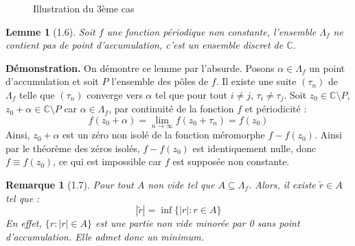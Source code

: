 \documentclass{article}
\newtheorem{lemma}{Lemme}
\newtheorem{remark}{Remarque}
\begin{document}
\begin{figure}[h]
    \centering
    \caption{Illustration du 3ème cas}
    \end{figure}


\begin{lemma}[1.6]
Soit \( f \) une fonction périodique non constante, l'ensemble \( \Lambda_f \) ne contient pas de point d'accumulation, c'est un ensemble discret de \( \mathbb{C} \).
\end{lemma}

\textbf{Démonstration.}
On démontre ce lemme par l'absurde. Posons \( \alpha \in \Lambda_f \) un point d'accumulation et soit \( P \) l'ensemble des pôles de \( f \). Il existe une suite \( (\tau_n) \) de \( \Lambda_f \) telle que \( (\tau_n) \) converge vers \( \alpha \) tel que pour tout \( i \neq j \), \( \tau_i \neq \tau_j \). Soit \( z_0 \in \mathbb{C}\setminus P \), \( z_0 + \alpha \in \mathbb{C}\setminus P \) car \( \alpha \in \Lambda_f \), par continuité de la fonction \( f \) et périodicité :
\[
f(z_0 + \alpha) = \lim_{n \to \infty} f(z_0 + \tau_n) = f(z_0)
\]
Ainsi, \( z_0 + \alpha \) est un zéro non isolé de la fonction méromorphe \( f - f(z_0) \). Ainsi par le théorème des zéros isolés, \( f - f(z_0) \) est identiquement nulle, donc \( f \equiv f(z_0) \), ce qui est impossible car \( f \) est supposée non constante.

\begin{remark}[1.7]
    Pour tout \( A \) non vide tel que \( A \subseteq \Lambda_f \). Alors, il existe \( \tilde{r} \in A \) tel que :
    \[ |\tilde{r}| = \inf\{|r|: r \in A\} \]
    En effet, \( \{r : |r| \in A\} \) est une partie non vide minorée par 0 sans point d'accumulation. Elle admet donc un minimum.

\end{remark}
\end{document}
